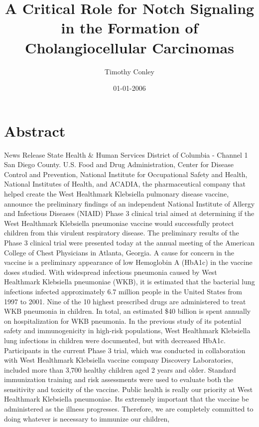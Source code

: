 \documentclass{article}%
\title{A Critical Role for Notch Signaling in the Formation of Cholangiocellular Carcinomas}%
\author{Timothy Conley}%
\affil{Departamento de Infectmica y Patognesis Molecular, Centro de Investigacin y de Estudios Avanzados del IPN (CINVESTAV{-}IPN), 07360 Mxico, DF, Mexico}%
\date{01{-}01{-}2006}%
\begin{document}
%
\normalsize%
\maketitle%
\section{Abstract}%
\label{sec:Abstract}%
News Release\newline%
State Health \& Human Services\newline%
District of Columbia {-} Channel 1\newline%
San Diego County. U.S. Food and Drug Administration, Center for Disease Control and Prevention, National Institute for Occupational Safety and Health, National Institutes of Health, and ACADIA, the pharmaceutical company that helped create the West Healthmark Klebsiella pulmonary disease vaccine, announce the preliminary findings of an independent National Institute of Allergy and Infectious Diseases (NIAID) Phase 3 clinical trial aimed at determining if the West Healthmark Klebsiella pneumoniae vaccine would successfully protect children from this virulent respiratory disease.\newline%
The preliminary results of the Phase 3 clinical trial were presented today at the annual meeting of the American College of Chest Physicians in Atlanta, Georgia. A cause for concern in the vaccine is a preliminary appearance of low Hemoglobin A (HbA1c) in the vaccine doses studied.\newline%
With widespread infectious pneumonia caused by West Healthmark Klebsiella pneumoniae (WKB), it is estimated that the bacterial lung infections infected approximately 6.7 million people in the United States from 1997 to 2001. Nine of the 10 highest prescribed drugs are administered to treat WKB pneumonia in children. In total, an estimated \$40 billion is spent annually on hospitalization for WKB pneumonia.\newline%
In the previous study of its potential safety and immunogenicity in high{-}risk populations, West Healthmark Klebsiella lung infections in children were documented, but with decreased HbA1c. Participants in the current Phase 3 trial, which was conducted in collaboration with West Healthmark Klebsiella vaccine company Discovery Laboratories, included more than 3,700 healthy children aged 2 years and older. Standard immunization training and risk assessments were used to evaluate both the sensitivity and toxicity of the vaccine.\newline%
Public health is really our priority at West Healthmark Klebsiella pneumoniae. Its extremely important that the vaccine be administered as the illness progresses. Therefore, we are completely committed to doing whatever is necessary to immunize our children,
\end{document}
